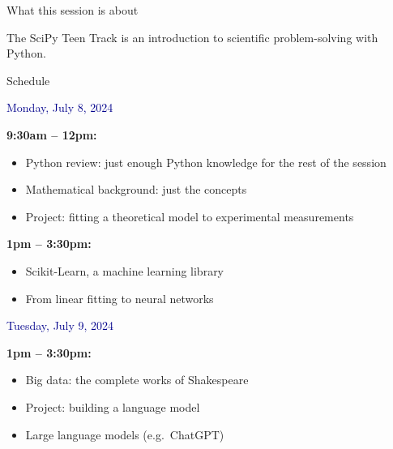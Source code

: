 \documentclass[aspectratio=169]{beamer}
\begin{document}
\begin{frame}{What this session is about}
\Large
\vspace{0.5 cm}

The SciPy Teen Track is an introduction to scientific problem-solving with Python.

\vspace{1 cm}

\vspace{1 cm}
\end{frame}

\begin{frame}{Schedule}
\vspace{0.5 cm}

\large
\textcolor{darkblue}{Monday, July 8, 2024}

\small
\vspace{0.1 cm}
{\bf 9:30am -- 12pm:}

\normalsize
\vspace{0.1 cm}
\begin{itemize}
\item Python review: just enough Python knowledge for the rest of the session
\item Mathematical background: just the concepts
\item Project: fitting a theoretical model to experimental measurements
\end{itemize}

\small
\vspace{0.1 cm}
{\bf 1pm -- 3:30pm:}

\normalsize
\vspace{0.1 cm}
\begin{itemize}
\item Scikit-Learn, a machine learning library
\item From linear fitting to neural networks
\end{itemize}

\large
\vspace{0.25 cm}
\textcolor{darkblue}{Tuesday, July 9, 2024}

\small
\vspace{0.1 cm}
{\bf 1pm -- 3:30pm:}

\normalsize
\vspace{0.1 cm}
\begin{itemize}
\item Big data: the complete works of Shakespeare
\item Project: building a language model
\item Large language models (e.g.\ ChatGPT)
\end{itemize}
\end{frame}
\end{document}
